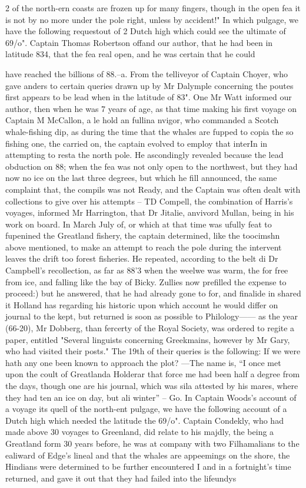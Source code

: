 \documentclass[10pt]{article}
\begin{document}
\begin{multicols}{2}
of the north-ern coasts are frozen up for many fingers, though in the open fea it is not by no more under the pole right, unless by accident!" In which pulgage, we have the following requestout of 2 Dutch high which could see the ultimate of 69/o". Captain Thomas Robertson offand our author, that he had been in latitude 834, that the fea real open, and he was certain that he could

have reached the billions of 88.--a. From the telliveyor of Captain Choyer, who gave anders to certain queries drawn up by Mr Dalymple concerning the poutes first appears to be lead when in the latitude of 83". One Mr Watt informed our author, then when he was 7 years of age, as that time making his first voyage on Captain M McCallon, a le hold an fullina nvigor, who commanded a Scotch whale-fishing dip, as during the time that the whales are fupped to copia the so fishing one, the carried on, the captain evolved to employ that interIn in attempting to resta the north pole. He ascondingly revealed because the lead obduction on 88; when the fea was not only open to the northwest, but they had now no ice on the last three degrees, but which he fill announced, the same complaint that, the compils was not Ready, and the Captain was often dealt with collections to give over his attempts – TD Compell, the combination of Harris’s voyages, informed Mr Harrington, that Dr Jitalie, anvivord Mullan, being in his work on board. In March July of, or which at that time was ufully feat to fupenined the Greatland fishery, the captain determined, like the toocimshn above mentioned, to make an attempt to reach the pole during the intervent leaves the drift too forest fisheries. He repeated, according to the belt di Dr Campbell's recollection, as far as 88'3 when the weelwe was warm, the for free from ice, and falling like the bay of Bicky. Zullies now prefilled the expense to proceed:) but he answered, that he had already gone to for, and finalide in shared it Holland has regarding his historic upon which account he would differ on journal to the kept, but returned is soon as possible to Philology—— as the year (66-20), Mr Dobberg, than fercerty of the Royal Society, was ordered to regite a paper, entitled "Several linguists concerning Greekmains, however by Mr Gary, who had visited their posts." The 19th of their queries is the following: If we were hath any one been known to approach the plot? —The name is, “I once met upon the coult of Greatlanda Holderar that force me had been half a degree from the days, though one are his journal, which was sila attested by his mares, where they had ten an ice on day, but ali winter” – Go. In Captain Woods’s account of a voyage its quell of the north-ent pulgage, we have the following account of a Dutch high which needed the latitude the 69/o". Captain Condekly, who had made above 30 voyages to Greenland, did relate to his majdly, the being a Greatland form 30 years before, he was at company with two Filhamalians to the ealiward of Edge’s lineal and that the whales are appeemings on the shore, the Hindians were determined to be further encountered I and in a fortnight’s time returned, and gave it out that they had failed into the lifeundys 
\end{multicols}
\end{document}
